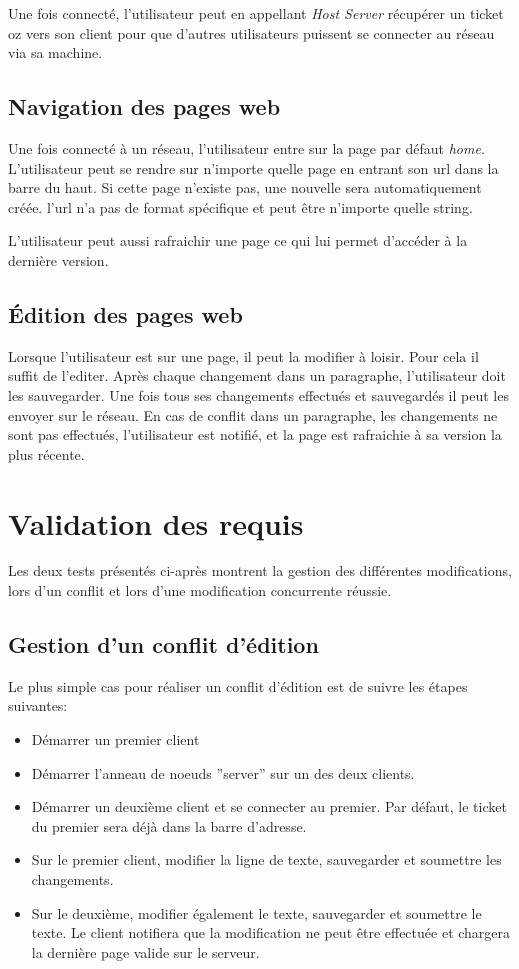 \documentclass{article}
\begin{document}
	Une fois connecté, l'utilisateur peut en appellant \emph{Host Server}
	récupérer un ticket oz vers son client pour que d'autres utilisateurs
	puissent se connecter au réseau via sa machine. 
	
	\subsection{Navigation des pages web}
	Une fois connecté à un réseau, l'utilisateur entre sur la page par défaut
	\emph{home}. L'utilisateur peut se rendre sur n'importe quelle page en
	entrant son url dans la barre du haut. Si cette page n'existe pas, 
	une nouvelle sera automatiquement créée. l'url n'a pas de format spécifique
	et peut être n'importe quelle string. 
	
	L'utilisateur peut aussi rafraichir une page ce qui lui permet d'accéder
	à la dernière version.
	
	\subsection{Édition des pages web}
	Lorsque l'utilisateur est sur une page, il peut la modifier à loisir.
	Pour cela il suffit de l'editer. Après chaque changement dans un paragraphe,
	l'utilisateur doit les sauvegarder. Une fois tous ses changements
	effectués et sauvegardés il peut les envoyer sur le réseau. En cas
	de conflit dans un paragraphe, les changements ne sont pas effectués,
	l'utilisateur est notifié, et la page est rafraichie à sa version la plus
	récente. 
	
	\section{Validation des requis}
	Les deux tests présentés ci-après montrent la gestion des différentes modifications,
	lors d'un conflit et lors d'une modification concurrente réussie.
	
	\subsection{Gestion d'un conflit d'édition}
	Le plus simple cas pour réaliser un conflit d'édition est de suivre les étapes suivantes:
	\begin{itemize}
		\item Démarrer un premier client
		\item Démarrer l'anneau de noeuds ''server'' sur un des deux clients.
		\item Démarrer un deuxième client et se connecter au premier.  Par défaut, le ticket
			du premier sera déjà dans la barre d'adresse.
		\item Sur le premier client, modifier la ligne de texte, sauvegarder et soumettre les
			changements.
		\item Sur le deuxième, modifier également le texte, sauvegarder et soumettre le texte. 
			Le client notifiera que la modification ne peut être effectuée et chargera la dernière
			page valide sur le serveur.	
	\end{itemize}
	
\end{document}

